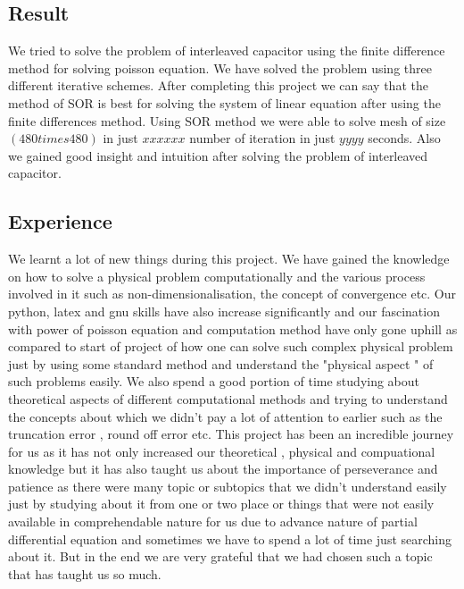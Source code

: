 \subsection{Result}
We tried to solve the problem of interleaved capacitor using the finite difference method for solving poisson equation. We have solved the problem using three different iterative schemes. After completing this project we can say that the method of SOR is best for solving the system of linear equation after using the finite differences method. Using SOR method we were able to solve mesh of size $ (480 times 480) $ in just $ xxxxxx $ number of iteration in just $  yyyy $ seconds. Also we gained good insight and intuition after solving the problem of interleaved capacitor.
\subsection{Experience}
We learnt a lot of new things during this project. We have gained the knowledge on how to solve a physical problem computationally and the various process involved in it such as non-dimensionalisation, the concept of convergence etc. Our python, latex and gnu skills have also increase significantly and our fascination with power of poisson equation and computation method have only gone uphill as compared to start of project of how one can solve such complex physical problem just by using some standard method and understand the "physical aspect " of such problems easily. We also spend a good portion of time studying about theoretical aspects of different computational methods and trying to understand the concepts about which we didn't pay a lot of attention to earlier such as the truncation error , round off error etc. This project has been an incredible journey for us as it has not only increased our theoretical , physical and compuational knowledge but it has also taught us about the importance of perseverance and patience as there were many topic or subtopics that we didn't understand easily just by studying about it from one or two place or things that were not easily available in comprehendable nature for us due to advance nature of partial differential equation and sometimes we have to spend a lot of time just searching about it. But in the end we are very grateful that we had chosen such a topic that has taught us so much. 
